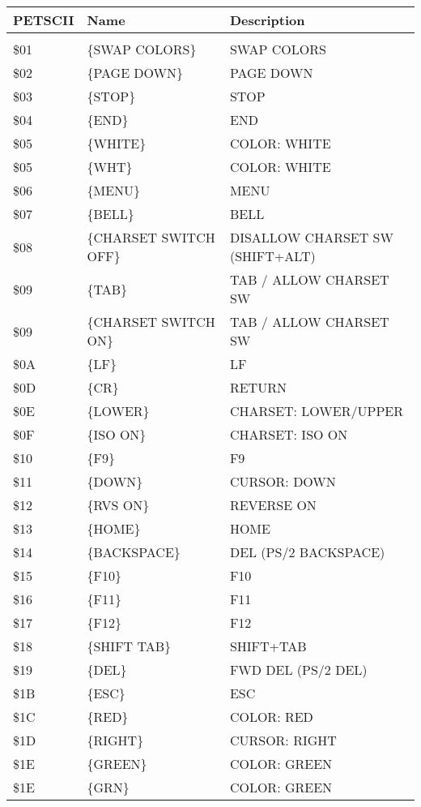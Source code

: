 \documentclass{article}
\begin{document}
    \begin{longtable}[l]{l l l}
        \textbf{PETSCII} & \textbf{Name} & \textbf{Description} \\
        \hline \\
        \$01 & \{SWAP COLORS\} & SWAP COLORS\\
        \$02 & \{PAGE DOWN\} & PAGE DOWN\\
        \$03 & \{STOP\} & STOP\\
        \$04 & \{END\} & END\\
        \$05 & \{WHITE\} & COLOR: WHITE\\
        \$05 & \{WHT\} & COLOR: WHITE\\
        \$06 & \{MENU\} & MENU\\
        \$07 & \{BELL\} & BELL\\
        \$08 & \{CHARSET SWITCH OFF\} & DISALLOW CHARSET SW (SHIFT+ALT)\\
        \$09 & \{TAB\} & TAB / ALLOW CHARSET SW\\
        \$09 & \{CHARSET SWITCH ON\} & TAB / ALLOW CHARSET SW\\
        \$0A & \{LF\} & LF\\
        \$0D & \{CR\} & RETURN\\
        \$0E & \{LOWER\} & CHARSET: LOWER/UPPER\\
        \$0F & \{ISO ON\} & CHARSET: ISO ON\\
        \$10 & \{F9\} & F9\\
        \$11 & \{DOWN\} & CURSOR: DOWN\\
        \$12 & \{RVS ON\} & REVERSE ON\\
        \$13 & \{HOME\} & HOME\\
        \$14 & \{BACKSPACE\} & DEL (PS/2 BACKSPACE)\\
        \$15 & \{F10\} & F10\\
        \$16 & \{F11\} & F11\\
        \$17 & \{F12\} & F12\\
        \$18 & \{SHIFT TAB\} & SHIFT+TAB\\
        \$19 & \{DEL\} & FWD DEL (PS/2 DEL)\\
        \$1B & \{ESC\} & ESC\\
        \$1C & \{RED\} & COLOR: RED\\
        \$1D & \{RIGHT\} & CURSOR: RIGHT\\
        \$1E & \{GREEN\} & COLOR: GREEN\\
        \$1E & \{GRN\} & COLOR: GREEN\\

\end{longtable}
\end{document}
